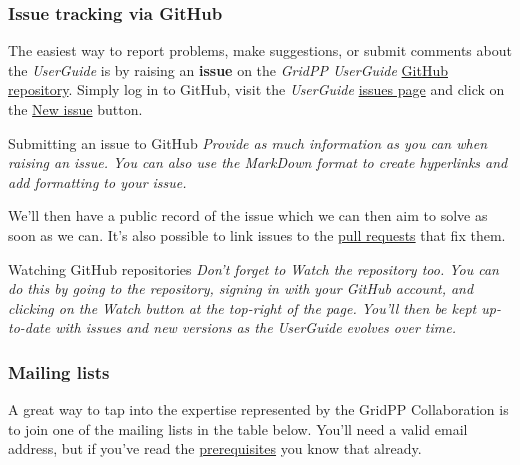\subsubsection{Issue tracking via GitHub}
\label{issue-tracking-via-github}
The easiest way to report problems, make suggestions, or submit comments
about the \emph{UserGuide} is by raising an \textbf{issue} on the
\emph{GridPP UserGuide}
\href{http://github.com/GridPP/user-guides}{GitHub repository}. Simply
log in to GitHub, visit the \emph{UserGuide}
\href{https://github.com/gridpp/user-guides/issues}{issues page} and
click on the \href{https://github.com/gridpp/user-guides/issues/new}{New
issue} button.

\begin{infobox}{Submitting an issue to GitHub}
\emph{Provide as much information as you can when raising an issue. You can
also use the MarkDown format to create hyperlinks and add formatting to
your issue.}
\end{infobox}

We'll then have a public record of the issue which we can then aim to
solve as soon as we can. It's also possible to link issues to the
\href{https://help.github.com/articles/using-pull-requests/}{pull
requests} that fix them.

\begin{infobox}{Watching GitHub repositories}
\emph{Don't forget to Watch the repository too. You can do this by going to
the repository, signing in with your GitHub account, and clicking on the
Watch button at the top-right of the page. You'll then be kept
up-to-date with issues and new versions as the UserGuide evolves over
time.}
\end{infobox}

\subsubsection{Mailing lists}
\label{mailing-lists}
A great way to tap into the expertise represented by the GridPP
Collaboration is to join one of the mailing lists in the table below.
You'll need a valid email address, but if you've read the
\hyperref[sec:prerequisites]{prerequisites} you know that already.

